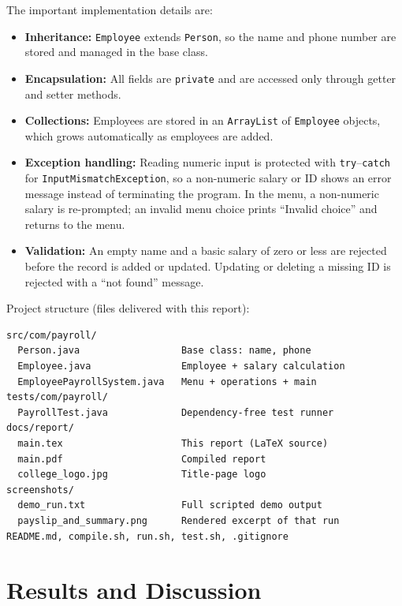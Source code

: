 \documentclass[11pt,a4paper]{article}
\begin{document}
The important implementation details are:

\begin{itemize}
  \item \textbf{Inheritance:} \texttt{Employee} extends
    \texttt{Person}, so the name and phone number are stored and
    managed in the base class.
  \item \textbf{Encapsulation:} All fields are \texttt{private} and
    are accessed only through getter and setter methods.
  \item \textbf{Collections:} Employees are stored in an
    \texttt{ArrayList} of \texttt{Employee} objects, which grows
    automatically as employees are added.
  \item \textbf{Exception handling:} Reading numeric input is
    protected with \texttt{try}--\texttt{catch} for
    \texttt{InputMismatch\-Exception}, so a non-numeric salary or ID
    shows an error message instead of terminating the program. In
    the menu, a non-numeric salary is re-prompted; an invalid menu
    choice prints ``Invalid choice'' and returns to the menu.
  \item \textbf{Validation:} An empty name and a basic salary of zero
    or less are rejected before the record is added or updated.
    Updating or deleting a missing ID is rejected with a
    ``not found'' message.
\end{itemize}

Project structure (files delivered with this report):

\begin{verbatim}
src/com/payroll/
  Person.java                  Base class: name, phone
  Employee.java                Employee + salary calculation
  EmployeePayrollSystem.java   Menu + operations + main
tests/com/payroll/
  PayrollTest.java             Dependency-free test runner
docs/report/
  main.tex                     This report (LaTeX source)
  main.pdf                     Compiled report
  college_logo.jpg             Title-page logo
screenshots/
  demo_run.txt                 Full scripted demo output
  payslip_and_summary.png      Rendered excerpt of that run
README.md, compile.sh, run.sh, test.sh, .gitignore
\end{verbatim}

\section{Results and Discussion}
\end{document}

